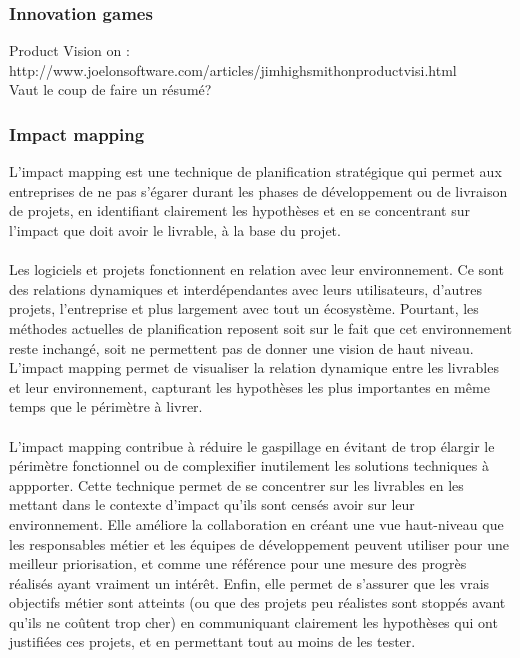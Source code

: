 		\subsubsection{Innovation games}
	Product Vision on : \\	
	http://www.joelonsoftware.com/articles/jimhighsmithonproductvisi.html \\
	Vaut le coup de faire un résumé?	
		\subsubsection{Impact mapping}
L'impact mapping est une technique de planification stratégique qui permet aux entreprises de ne pas s'égarer durant les phases de développement ou de livraison de projets, en identifiant clairement les hypothèses et en se concentrant sur l'impact que doit avoir le livrable, à la base du projet.

\paragraph{}
Les logiciels et projets fonctionnent en relation avec leur environnement. Ce sont des relations dynamiques et interdépendantes avec leurs utilisateurs, d'autres projets, l'entreprise et plus largement avec tout un écosystème. Pourtant, les méthodes actuelles de planification reposent soit sur le fait que cet environnement reste inchangé, soit ne permettent pas de donner une vision de haut niveau. L'impact mapping permet de visualiser la relation dynamique entre les livrables et leur environnement, capturant les hypothèses les plus importantes en même temps que le périmètre à livrer\cite{Adzi12}.		

\paragraph{}L'impact mapping contribue à réduire le gaspillage en évitant de trop élargir le périmètre fonctionnel ou de complexifier inutilement les solutions techniques à appporter. Cette technique permet de se concentrer sur les livrables en les mettant dans le contexte d'impact qu'ils sont censés avoir sur leur environnement. Elle améliore la collaboration en créant une vue haut-niveau que les responsables métier et les équipes de développement peuvent utiliser pour une meilleur priorisation, et comme une référence pour une mesure des progrès réalisés ayant vraiment un intérêt. Enfin, elle permet de s'assurer que les vrais objectifs métier sont atteints (ou que des projets peu réalistes sont stoppés avant qu'ils ne coûtent trop cher) en communiquant clairement les hypothèses qui ont justifiées ces projets, et en permettant tout au moins de les tester.

